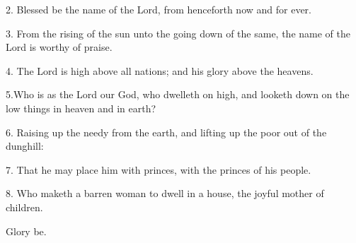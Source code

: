  	
2. Blessed be the name of the Lord, from henceforth now and for ever.
 	
3. From the rising of the sun unto the going down of the same, the name of the Lord is worthy of praise.
 	
4. The Lord is high above all nations; and his glory above the heavens.
 	
5.Who is as the Lord our God, who dwelleth on high, and looketh down on the low things in heaven and in earth?
 	
6. Raising up the needy from the earth, and lifting up the poor out of the dunghill:
 	
7. That he may place him with princes, with the princes of his people.
 	
8. Who maketh a barren woman to dwell in a house, the joyful mother of children. 

Glory be.